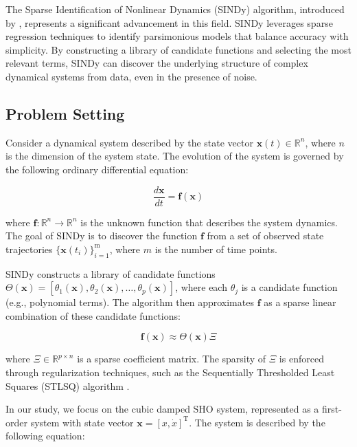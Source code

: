 \documentclass{article} %
\begin{document}
The Sparse Identification of Nonlinear Dynamics (SINDy) algorithm, introduced by \citet{Brunton2015DiscoveringGE}, represents a significant advancement in this field. SINDy leverages sparse regression techniques to identify parsimonious models that balance accuracy with simplicity. By constructing a library of candidate functions and selecting the most relevant terms, SINDy can discover the underlying structure of complex dynamical systems from data, even in the presence of noise.

\subsection{Problem Setting}
Consider a dynamical system described by the state vector $\mathbf{x}(t) \in \mathbb{R}^n$, where $n$ is the dimension of the system state. The evolution of the system is governed by the following ordinary differential equation:

\begin{equation}
    \frac{d\mathbf{x}}{dt} = \mathbf{f}(\mathbf{x})
\end{equation}

where $\mathbf{f}: \mathbb{R}^n \rightarrow \mathbb{R}^n$ is the unknown function that describes the system dynamics. The goal of SINDy is to discover the function $\mathbf{f}$ from a set of observed state trajectories $\{\mathbf{x}(t_i)\}_{i=1}^{\mathrm{m}}$, where $m$ is the number of time points.

SINDy constructs a library of candidate functions $\Theta(\mathbf{x}) = [\theta_1(\mathbf{x}), \theta_2(\mathbf{x}), \ldots, \theta_p(\mathbf{x})]$, where each $\theta_j$ is a candidate function (e.g., polynomial terms). The algorithm then approximates $\mathbf{f}$ as a sparse linear combination of these candidate functions:

\begin{equation}
    \mathbf{f}(\mathbf{x}) \approx \Theta(\mathbf{x})\Xi
\end{equation}

where $\Xi \in \mathbb{R}^{p \times n}$ is a sparse coefficient matrix. The sparsity of $\Xi$ is enforced through regularization techniques, such as the Sequentially Thresholded Least Squares (STLSQ) algorithm \citep{bahdanau2014neural}.

In our study, we focus on the cubic damped SHO system, represented as a first-order system with state vector $\mathbf{x} = [x, \dot{x}]^{\mathrm{T}}$. The system is described by the following equation:
\end{document}
